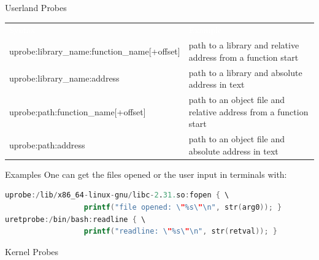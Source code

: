 \begin{reveals}
\begin{frame}[c,fragile]{Userland Probes}
  \begin{center}
      \color{deepblue}
    \begin{tabular}{|p{}p{}|}
      \arrayrulecolor{deepblue}
          {\cellcolor{deepblue}\textcolor{white}{Syntax}} &
                                                          {\cellcolor{deepblue}\textcolor{white}{Example}} \\
      uprobe:library\_name:function\_name[+offset] & path to a library and relative address from a function start\\
      uprobe:library\_name:address & path to a library and absolute address in text\\
      uprobe:path:function\_name[+offset] & path to an object file and relative address from a function start\\
      uprobe:path:address & path to an object file and absolute address in text\\\hline
    \end{tabular}
  \end{center}
  \vfill
  \begin{block}{Examples}
    One can get the files opened or the user input in terminals with:
\begin{lstlisting}[language=Awk]
uprobe:/lib/x86_64-linux-gnu/libc-2.31.so:fopen { \
                  printf("file opened: \"%s\"\n", str(arg0)); }
uretprobe:/bin/bash:readline { \
                  printf("readline: \"%s\"\n", str(retval)); }
\end{lstlisting}
  \end{block}
\end{frame}


\begin{frame}[c,fragile]{Kernel Probes}
  

\end{frame}
\end{reveals}
